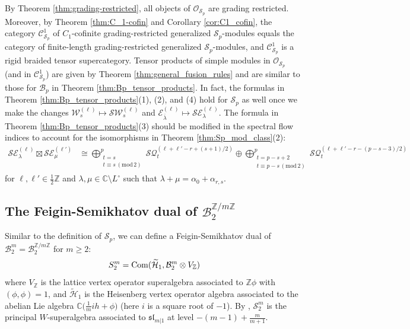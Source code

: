 \documentclass[11pt, reqno]{amsart}
\theoremstyle{definition}\newtheorem{defi}[thm]{Definition}
\theoremstyle{definition}\newtheorem{rem}[thm]{Remark}
\theoremstyle{definition}\newtheorem{exam}[thm]{Example}
\theoremstyle{definition}\newtheorem{assum}[thm]{Assumption}
\newcommand{\cB}{\mathcal{B}}
\newcommand{\cE}{\mathcal{E}}
\newcommand{\cH}{\mathcal{H}}
\newcommand{\cS}{\mathcal{S}}
\newcommand{\cO}{\mathcal{O}}
\newcommand{\cC}{\mathcal{C}}
\newcommand{\cW}{\mathcal{W}}
\newcommand{\CC}{\mathbb{C}}
\newcommand{\ZZ}{\mathbb{Z}}
\newcommand{\tens}{\boxtimes}
\begin{document}
By Theorem \ref{thm:grading-restricted}, all objects of $\cO_{\cS_p}$ are grading restricted. Moreover, by Theorem \ref{thm:C_1-cofin} and Corollary \ref{cor:C1_cofin}, the category $\cC_{\cS_p}^1$ of $C_1$-cofinite grading-restricted generalized $\cS_p$-modules equals the category of finite-length grading-restricted generalized $\cS_p$-modules, and $\cC^1_{\cS_p}$ is a rigid braided tensor supercategory. Tensor products of simple modules in $\cO_{\cS_p}$ (and in $\cC^1_{\cS_p}$) are given by Theorem \ref{thm:general_fusion_rules} and are similar to those for $\cB_p$ in Theorem \ref{thm:Bp_tensor_products}. In fact, the formulas in Theorem \ref{thm:Bp_tensor_products}(1), (2), and (4) hold for $\cS_p$ as well once we make the changes $\cW_s^{(\ell)}\mapsto\cS\cW_s^{(\ell)}$ and $\cE^{(\ell)}_{\overline{\lambda}}\mapsto\cS\cE^{(\ell)}_{\lambda}$. The formula in Theorem \ref{thm:Bp_tensor_products}(3) should be modified in the spectral flow indices to account for the isomorphisms in Theorem \ref{thm:Sp_mod_class}(2):
\begin{align*}
\cS\cE_{\lambda}^{(\ell)}\tens\cS\cE_{\mu}^{(\ell')}&\cong\bigoplus_{\substack{t=s\\ t\equiv s\,(\mathrm{mod}\,2)}}^p \cS\mathcal{Q}_{t}^{(\ell+\ell'-r+(s+1)/2)}\oplus \bigoplus_{\substack{t=p-s+2\\ t\equiv p-s\,(\mathrm{mod}\,2)}}^p \cS\mathcal{Q}_{t}^{(\ell+\ell'-r-(p-s-3)/2)}
\end{align*}
for $\ell,\ell'\in\frac{1}{2}\ZZ$ and $\lambda,\mu\in\CC\setminus L^\circ$ such that $\lambda+\mu=\alpha_0+\alpha_{r,s}$.



\subsection{The Feigin-Semikhatov dual of \texorpdfstring{$\cB_2^{\ZZ/m\ZZ}$}{B2m}}


Similar to the definition of $\cS_p$, we can define a Feigin-Semikhatov dual of $\cB_2^m=\cB_2^{\ZZ/m\ZZ}$ for $m\geq 2$:
\begin{equation*}
S_2^m = {\rm Com}(\widetilde{\cH}_1, \cB_2^m\otimes V_{\ZZ}) 
\end{equation*} 
where $V_{\ZZ}$ is the lattice vertex operator superalgebra associated to $\ZZ\phi$ with $(\phi, \phi) = 1$, and $\widetilde{\cH}_1$ is the Heisenberg vertex operator algebra associated to the abelian Lie algebra $\CC\big(\frac{1}{m}ih + \phi\big)$ (here $i$ is a square root of $-1$). By \cite[Theorem~4.4(2)]{CGN}, $\cS_2^m$ is the principal $W$-superalgebra associated to $\mathfrak{sl}_{m\vert 1}$ at level $-(m-1)+\frac{m}{m+1}$.
\end{document}
